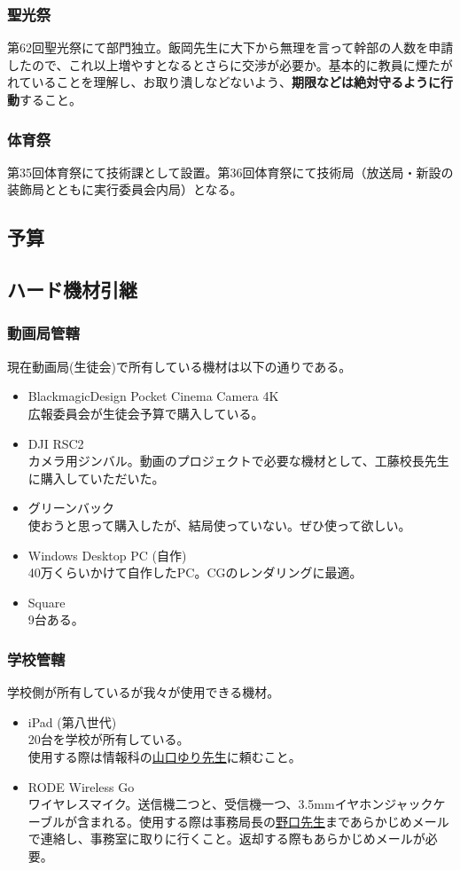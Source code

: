 \documentclass[dvipdfmx,jb5]{jarticle}
\newcommand{\mail}[2]{\href{#2}{#1}}
\begin{document}
\subsubsection{聖光祭}
第62回聖光祭にて部門独立。飯岡先生に大下から無理を言って幹部の人数を申請したので、これ以上増やすとなるとさらに交渉が必要か。基本的に教員に煙たがれていることを理解し、お取り潰しなどないよう、{\bf 期限などは絶対守るように行動}すること。
\subsubsection{体育祭}
第35回体育祭にて技術課として設置。第36回体育祭にて技術局（放送局・新設の装飾局とともに実行委員会内局）となる。

\subsection{予算}\label{sec:予算}
\subsection{ハード機材引継}
\subsubsection{動画局管轄}
 現在動画局(生徒会)で所有している機材は以下の通りである。
 \begin{itemize}
  \item BlackmagicDesign Pocket Cinema Camera 4K\\
  広報委員会が生徒会予算で購入している。
  \item DJI RSC2\\
  カメラ用ジンバル。動画のプロジェクトで必要な機材として、工藤校長先生に購入していただいた。
  \item グリーンバック\\
  使おうと思って購入したが、結局使っていない。ぜひ使って欲しい。
  \item Windows Desktop PC (自作)\\
 40万くらいかけて自作したPC。CGのレンダリングに最適。
  \item Square\\
  9台ある。
 \end{itemize}

 \subsubsection{学校管轄}
 学校側が所有しているが我々が使用できる機材。
 \begin{itemize}
  \item iPad (第八世代)\\
  20台を学校が所有している。\\
  使用する際は情報科の\mail{山口ゆり先生}{yuri.yamaguchi@seiko.ac.jp}に頼むこと。
  \item RODE Wireless Go\\
  ワイヤレスマイク。送信機二つと、受信機一つ、3.5mmイヤホンジャックケーブルが含まれる。使用する際は事務局長の\mail{野口先生}{noguchi@seiko.ac.jp}まであらかじめメールで連絡し、事務室に取りに行くこと。返却する際もあらかじめメールが必要。
 \end{itemize}
\end{document}
